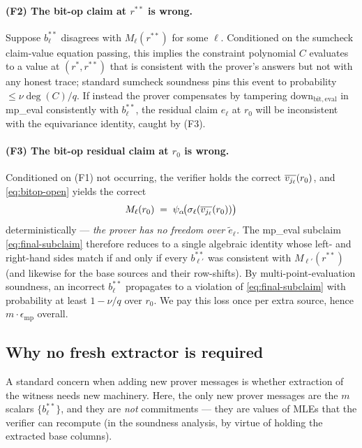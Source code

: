 \paragraph{(F2) The bit-op claim at $r^{**}$ is wrong.} Suppose
$b_{\ell}^{**}$ disagrees with $M_{\ell}(r^{**})$ for some $\ell$.
Conditioned on the sumcheck claim-value equation passing, this implies
the constraint polynomial $C$ evaluates to a value at $(r^*, r^{**})$
that is consistent with the prover's answers but not with any honest
trace; standard sumcheck soundness pins this event to probability
$\le \nu \deg(C)/q$. If instead the prover compensates by tampering
$\mathrm{down}_{\mathrm{bit, eval}}$ in mp\_eval consistently with
$b_{\ell}^{**}$, the residual claim $e_{\ell}$ at $r_0$ will be
inconsistent with the equivariance identity, caught by (F3).

\paragraph{(F3) The bit-op residual claim at $r_0$ is wrong.}
Conditioned on (F1) not occurring, the verifier holds the correct
$\overline{v_{j_\ell}}(r_0)$, and \cref{eq:bitop-open} yields the correct
\[
  M_{\ell}(r_0) \;=\; \psi_{\alpha}\!\big(\sigma_{\ell}(\overline{v_{j_\ell}}(r_0))\big)
\]
deterministically — \emph{the prover has no freedom over $\tilde e_\ell$.}
The mp\_eval subclaim \cref{eq:final-subclaim} therefore reduces to a
single algebraic identity whose left- and right-hand sides match if
and only if every $b_{\ell'}^{**}$ was consistent with
$M_{\ell'}(r^{**})$ (and likewise for the base sources and their
row-shifts). By multi-point-evaluation soundness, an incorrect
$b_{\ell}^{**}$ propagates to a violation of \cref{eq:final-subclaim}
with probability at least $1 - \nu/q$ over $r_0$. We pay this loss
once per extra source, hence $m \cdot \epsilon_{\mathrm{mp}}$ overall.

\subsection{Why no fresh extractor is required}

A standard concern when adding new prover messages is whether
extraction of the witness needs new machinery. Here, the only new
prover messages are the $m$ scalars $\{b_{\ell}^{**}\}$, and they are
\emph{not} commitments — they are values of MLEs that the verifier
can recompute (in the soundness analysis, by virtue of holding the
extracted base columns).

